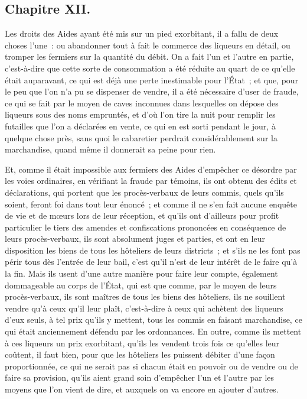 \documentclass[french,twoside]{book} %
\begin{document}
\subsection[{Chapitre XII.}]{Chapitre XII.}
\noindent Les droits des Aides ayant été mis sur un pied exorbitant, il a fallu de deux choses l’une : ou abandonner tout à fait le commerce des liqueurs en détail, ou tromper les fermiers sur la quantité du débit. On a fait l’un et l’autre en partie, c’est-à-dire que cette sorte de consommation a été réduite au quart de ce qu’elle était auparavant, ce qui est déjà une perte inestimable pour l’État ; et que, pour le peu que l’on n’a pu se dispenser de vendre, il a été nécessaire d’user de fraude, ce qui se fait par le moyen de caves inconnues dans lesquelles on dépose des liqueurs sous des noms empruntés, et d’où l’on tire la nuit pour remplir les futailles que l’on a déclarées en vente, ce qui en est sorti pendant le jour, à quelque chose près, sans quoi le cabaretier perdrait considérablement sur la marchandise, quand même il donnerait sa peine pour rien.\par
Et, comme il était impossible aux fermiers des Aides d’empêcher ce désordre par les voies ordinaires, en vérifiant la fraude par témoins, ils ont obtenu des édits et déclarations, qui portent que les procès-verbaux de leurs commis, quels qu’ils soient, feront foi dans tout leur énoncé ; et comme il ne s’en fait aucune enquête de vie et de mœurs lors de leur réception, et qu’ils ont d’ailleurs pour profit particulier le tiers des amendes et confiscations prononcées en conséquence de leurs procès-verbaux, ils sont absolument juges et parties, et ont en leur disposition les biens de tous les hôteliers de leurs districts ; et s’ils ne les font pas périr tous dès l’entrée de leur bail, c’est qu’il n’est de leur intérêt de le faire qu’à la fin. Mais ils usent d’une autre manière pour faire leur compte, également dommageable au corps de l’État, qui est que comme, par le moyen de leurs procès-verbaux, ils sont maîtres de tous les biens des hôteliers, ils ne souillent vendre qu’à ceux qu’il leur plaît, c’est-à-dire à ceux qui achètent des liqueurs d’eux seuls, à tel prix qu’ils y mettent, tous les commis en faisant marchandise, ce qui était anciennement défendu par les ordonnances. En outre, comme ils mettent à ces liqueurs un prix exorbitant, qu’ils les vendent trois fois ce qu’elles leur coûtent, il faut bien, pour que les hôteliers les puissent débiter d’une façon proportionnée, ce qui ne serait pas si chacun était en pouvoir ou de vendre ou de faire sa provision, qu’ils aient grand soin d’empêcher l’un et l’autre par les moyens que l’on vient de dire, et auxquels on va encore en ajouter d’autres.\par
\end{document}
